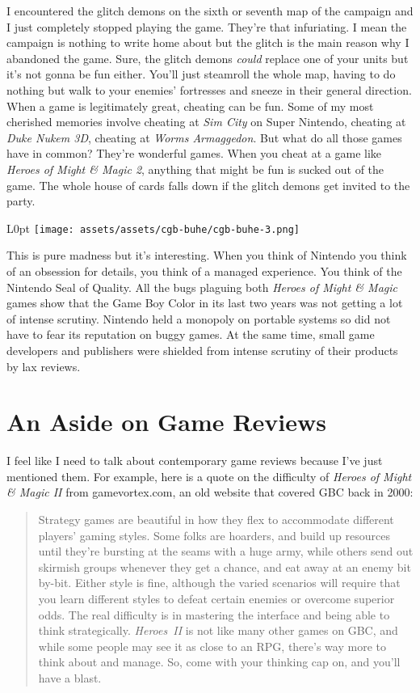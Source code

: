 \documentclass{book}
\begin{document}
I encountered the glitch demons on the sixth or seventh map of the campaign and I just completely stopped playing the game. They’re that infuriating. I mean the campaign is nothing to write home about but the glitch is the main reason why I abandoned the game. Sure, the glitch demons \emph{could} replace one of your units but it’s not gonna be fun either. You’ll just steamroll the whole map, having to do nothing but walk to your enemies’ fortresses and sneeze in their general direction. When a game is legitimately great, cheating can be fun. Some of my most cherished memories involve cheating at \emph{Sim City} on Super Nintendo, cheating at \emph{Duke Nukem 3D}, cheating at \emph{Worms Armaggedon}. But what do all those games have in common? They’re wonderful games. When you cheat at a game like \emph{Heroes of Might \& Magic 2}, anything that might be fun is sucked out of the game. The whole house of cards falls down if the glitch demons get invited to the party.

\begin{wrapfigure}{L}{0pt} \texttt{[image: assets/assets/cgb-buhe/cgb-buhe-3.png]}\end{wrapfigure}
This is pure madness but it’s interesting. When you think of Nintendo you think of an obsession for details, you think of a managed experience. You think of the Nintendo Seal of Quality. All the bugs plaguing both \emph{Heroes of Might \& Magic} games show that the Game Boy Color in its last two years was not getting a lot of intense scrutiny. Nintendo held a monopoly on portable systems so did not have to fear its reputation on buggy games. At the same time, small game developers and publishers were shielded from intense scrutiny of their products by lax reviews.

\FloatBarrier\needspace{10mm}\section*{An Aside on Game Reviews}\nopagebreak[4]

I feel like I need to talk about contemporary game reviews because I’ve just mentioned them. For example, here is a quote on the difficulty of \emph{Heroes of Might \& Magic II} from gamevortex.com, an old website that covered GBC back in 2000:

\begin{quote}
Strategy games are beautiful in how they flex to accommodate different players’ gaming styles. Some folks are hoarders, and build up resources until they’re bursting at the seams with a huge army, while others send out skirmish groups whenever they get a chance, and eat away at an enemy bit by-bit. Either style is fine, although the varied scenarios will require that you learn different styles to defeat certain enemies or overcome superior odds. The real difficulty is in mastering the interface and being able to think strategically. \emph{Heroes~II} is not like many other games on GBC, and while some people may see it as close to an RPG, there’s way more to think about and manage. So, come with your thinking cap on, and you’ll have a blast.
\end{quote} \par
\end{document}
